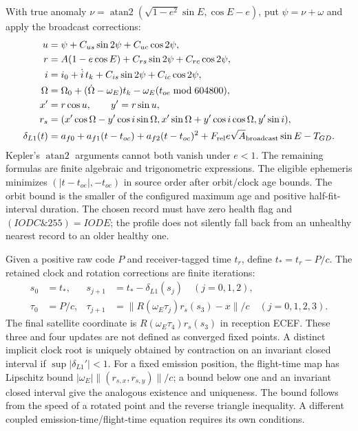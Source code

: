 With true anomaly $\nu=\operatorname{atan2}(\sqrt{1-e^2}\sin E,\cos E-e)$,
put $\psi=\nu+\omega$ and apply the broadcast corrections:
\begin{align}
 u&=\psi+C_{us}\sin2\psi+C_{uc}\cos2\psi,\\
 r&=A(1-e\cos E)+C_{rs}\sin2\psi+C_{rc}\cos2\psi,\\
 i&=i_0+\dot i\,t_k+C_{is}\sin2\psi+C_{ic}\cos2\psi,\\
 \Omega&=\Omega_0+(\dot\Omega-\omega_E)t_k-\omega_E(t_{oe}\bmod604800),\\
 x'&=r\cos u,\qquad y'=r\sin u,\\
 r_s&=(x'\cos\Omega-y'\cos i\sin\Omega,
       x'\sin\Omega+y'\cos i\cos\Omega,y'\sin i),\\
 \delta_{L1}(t)&=a_{f0}+a_{f1}(t-t_{oc})+a_{f2}(t-t_{oc})^2
       +F_{\rm rel}e\sqrt A_{\rm broadcast}\sin E-T_{GD}.
\end{align}
Kepler's $\operatorname{atan2}$ arguments cannot both vanish under $e<1$.
The remaining formulas are finite algebraic and trigonometric expressions.
The eligible ephemeris minimizes $(|t-t_{oe}|,-t_{oc})$ in source order after
orbit/clock age bounds. The orbit bound is the smaller of the configured maximum
age and positive half-fit-interval duration. The chosen record must have zero
health flag and $(IODC\mathbin{\&}255)=IODE$; the profile does not silently
fall back from an unhealthy nearest record to an older healthy one.

Given a positive raw code $P$ and receiver-tagged time $t_r$, define
$t_*=t_r-P/c$. The retained clock and rotation corrections are finite iterations:
\begin{align}
 s_0&=t_*,&s_{j+1}&=t_*-\delta_{L1}(s_j)\quad(j=0,1,2),\\
 \tau_0&=P/c,&\tau_{j+1}&=\|R(\omega_E\tau_j)r_s(s_3)-x\|/c
                      \quad(j=0,1,2,3).
\end{align}
The final satellite coordinate is $R(\omega_E\tau_4)r_s(s_3)$ in reception
ECEF. These three and four updates are not defined as converged fixed points.
A distinct implicit clock root is uniquely obtained by contraction on an
invariant closed interval if $\sup|\delta_{L1}'|<1$. For a fixed emission
position, the flight-time map has Lipschitz bound
$|\omega_E|\|(r_{s,x},r_{s,y})\|/c$; a bound below one and an invariant closed
interval give the analogous existence and uniqueness. The bound follows from
the speed of a rotated point and the reverse triangle inequality. A different
coupled emission-time/flight-time equation requires its own conditions.

